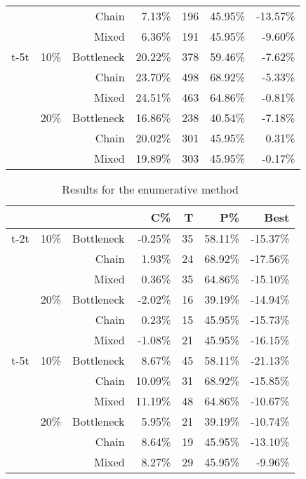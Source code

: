 \documentclass{singlecol-new}
\begin{document}
\begin{table}[!htbp]
\begin{tabular}{|r|r|r|r|r|r|r|}
          &       & Chain & 7.13\% & 196   & 45.95\% & -13.57\% \\
          &       & Mixed & 6.36\% & 191   & 45.95\% & -9.60\% \\
\hline
    t-5t  & 10\%  & Bottleneck & 20.22\% & 378   & 59.46\% & -7.62\% \\
          &       & Chain & 23.70\% & 498   & 68.92\% & -5.33\% \\
          &       & Mixed & 24.51\% & 463   & 64.86\% & -0.81\% \\
          & 20\%  & Bottleneck & 16.86\% & 238   & 40.54\% & -7.18\% \\
          &       & Chain & 20.02\% & 301   & 45.95\% & 0.31\% \\
          &       & Mixed & 19.89\% & 303   & 45.95\% & -0.17\% \\
\hline
    \end{tabular}\label{tab:results_brkga}\end{table}

\begin{table}[!htbp]
  \centering
  \caption{Results for the enumerative method}
    \begin{tabular}{|r|r|r|r|r|r|r|}
\hline
          &       &       & C\%   & T     & P\%   & Best \\
\hline
    t-2t  & 10\%  & Bottleneck & -0.25\% & 35    & 58.11\% & -15.37\%\\
          &       & Chain & 1.93\% & 24    & 68.92\% & -17.56\% \\
          &       & Mixed & 0.36\% & 35    & 64.86\% & -15.10\%  \\
          & 20\%  & Bottleneck & -2.02\% & 16    & 39.19\% & -14.94\% \\
          &       & Chain & 0.23\% & 15    & 45.95\% & -15.73\% \\
          &       & Mixed & -1.08\% & 21    & 45.95\% & -16.15\%  \\
\hline
    t-5t  & 10\%  & Bottleneck & 8.67\% & 45    & 58.11\% & -21.13\%\\
          &       & Chain & 10.09\% & 31    & 68.92\% & -15.85\% \\
          &       & Mixed & 11.19\% & 48    & 64.86\% & -10.67\%  \\
          & 20\%  & Bottleneck & 5.95\% & 21    & 39.19\% & -10.74\% \\
          &       & Chain & 8.64\% & 19    & 45.95\% & -13.10\% \\
          &       & Mixed & 8.27\% & 29    & 45.95\% & -9.96\%  \\
\hline
    \end{tabular}\label{tab:results_enum}\end{table}
\end{document}
